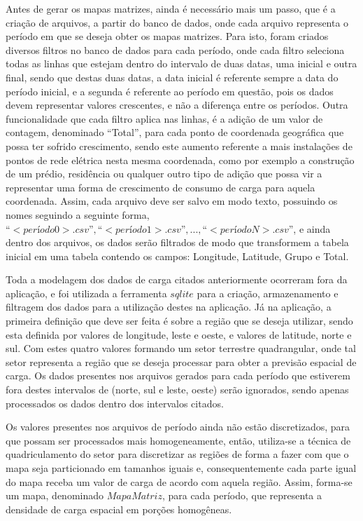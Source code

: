 Antes de gerar os mapas matrizes, ainda é necessário mais um passo, que é a criação de arquivos, a partir do banco de dados, onde cada arquivo representa o período em que se deseja obter os mapas matrizes. Para isto, foram criados diversos filtros no banco de dados para cada período, onde cada filtro seleciona todas as linhas que estejam dentro do intervalo de duas datas, uma inicial e outra final, sendo que destas duas datas, a data inicial é referente sempre a data do período inicial, e a segunda é referente ao período em questão, pois os dados devem representar valores crescentes, e não a diferença entre os períodos. Outra funcionalidade que cada filtro aplica nas linhas, é a adição de um valor de contagem, denominado “Total”, para cada ponto de coordenada geográfica que possa ter sofrido crescimento, sendo este aumento referente a mais instalações de pontos de rede elétrica nesta mesma coordenada, como por exemplo a construção de um prédio, residência ou qualquer outro tipo de adição que possa vir a representar uma forma de crescimento de consumo de carga para aquela coordenada. Assim, cada arquivo deve ser salvo em modo texto, possuindo os nomes seguindo a seguinte forma, \(“<período0>.csv”, “<período1>.csv”, ..., “<períodoN>.csv”\), e ainda dentro dos arquivos, os dados serão filtrados de modo que transformem a tabela inicial em uma tabela contendo os campos: Longitude, Latitude, Grupo e Total.

Toda a modelagem dos dados de carga citados anteriormente ocorreram fora da aplicação, e foi utilizada a ferramenta \(sqlite\) para a criação, armazenamento e filtragem dos dados para a utilização destes na aplicação. Já na aplicação, a primeira definição que deve ser feita é sobre a região que se deseja utilizar, sendo esta definida por valores de longitude, leste e oeste, e valores de latitude, norte e sul. Com estes quatro valores formando um setor terrestre quadrangular, onde tal setor representa a região que se deseja processar para obter a previsão espacial de carga. Os dados presentes nos arquivos gerados para cada período que estiverem fora destes intervalos de (norte, sul e leste, oeste) serão ignorados, sendo apenas processados os dados dentro dos intervalos citados. 

Os valores presentes nos arquivos de período ainda não estão discretizados, para que possam ser processados  mais homogeneamente, então, utiliza-se a técnica de quadriculamento do setor para discretizar as regiões de forma a fazer com que o mapa seja particionado em tamanhos iguais e, consequentemente cada parte igual do mapa receba um valor de carga de acordo com aquela região. Assim, forma-se um mapa, denominado \(Mapa Matriz\), para cada período, que representa a densidade de carga espacial em porções homogêneas.

